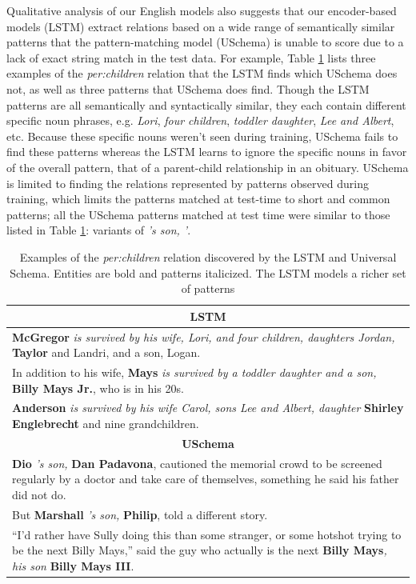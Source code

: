 Qualitative analysis of our English models also suggests that our encoder-based models (LSTM) extract relations based on a wide range of semantically similar patterns that the pattern-matching model (USchema) is unable to score due to a lack of exact string match in the test data. For example, Table \ref{tab:lstm-us-similar-rels} lists three examples of the \emph{per:children} relation that the LSTM finds which USchema does not, as well as three patterns that USchema does find. Though the LSTM patterns are all semantically and syntactically similar, they each contain different specific noun phrases, e.g. \emph{Lori}, \emph{four children}, \emph{toddler daughter}, \emph{Lee and Albert}, etc. Because these specific nouns weren't seen during training, USchema fails to find these patterns whereas the LSTM learns to ignore the specific nouns in favor of the overall pattern, that of a parent-child relationship in an obituary. USchema is limited to finding the relations represented by patterns observed during training, which limits the patterns matched at test-time to short and common patterns; all the USchema patterns matched at test time were similar to those listed in Table \ref{tab:lstm-us-similar-rels}: variants of \emph{'s son, '}.


\begin{table}[h]
\begin{center}
\small
\begin{tabular}{|p{7.6cm}|}
\hline
\multicolumn{1}{|c|}{\textbf{LSTM}} \\ \hline
{\bf McGregor} \emph{is survived by his wife, Lori, and four children, daughters Jordan,} { \bf Taylor} and Landri, and a son, Logan. \\ \hline
In addition to his wife, {\bf Mays} \emph{is survived by a toddler daughter and a son,} {\bf Billy Mays Jr.}, who is in his 20s. \\ \hline
{\bf Anderson} \emph{is survived by his wife Carol, sons Lee and Albert, daughter} {\bf Shirley Englebrecht} and nine grandchildren. \\
\hline\hline
\multicolumn{1}{|c|}{\textbf{USchema}}  \\ \hline
{\bf Dio} \emph{'s son,} {\bf Dan Padavona}, cautioned the memorial crowd to be screened regularly by a doctor and take care of themselves, something he said his father did not do. \\ \hline
But {\bf Marshall} \emph{'s son,} {\bf Philip}, told a different story.  \\ \hline
``I'd rather have Sully doing this than some stranger, or some hotshot trying to
be the next Billy Mays,'' said the guy who actually is the next {\bf Billy Mays}\emph{, his son} {\bf Billy Mays III}. \\
\hline
\end{tabular}
\caption{Examples of the \emph{per:children} relation discovered by the LSTM and Universal Schema. Entities are bold and patterns italicized. The LSTM models a richer set of patterns \label{tab:lstm-us-similar-rels}}
\end{center}
\vspace{-.5cm}
\end{table}



